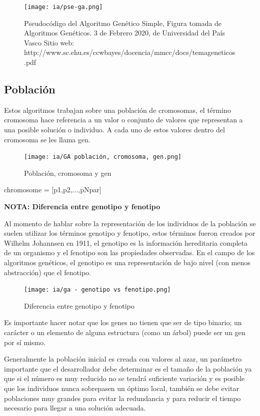 \documentclass[11pt,fleqn]{book} %
\begin{document}
\begin{figure}[ht]
\centering\texttt{[image: ia/pse-ga.png]}
\caption{Pseudocódigo del Algoritmo Genético Simple, Figura tomada de Algoritmos Genéticos. 3 de Febrero 2020, de Universidad del País Vasco Sitio web: http://www.sc.ehu.es/ccwbayes/docencia/mmcc/docs/temageneticos.pdf}
\label{fig:pse-ga} 
\end{figure}

\subsection{Población}

Estos algoritmos trabajan sobre una población de cromosomas, el término cromosoma hace referencia a un valor o conjunto de valores que representan a una posible solución o individuo. A cada uno de estos valores dentro del cromosoma se les llama gen.

\begin{figure}[ht]
\centering\texttt{[image: ia/GA población, cromosoma, gen.png]}
\caption{Población, cromosoma y gen}
\label{fig:pob-crom-gen} 
\end{figure}

chromosome = [p1,p2,...,pNpar]

\textbf{NOTA: Diferencia entre genotipo y fenotipo}

Al momento de hablar sobre la representación de los individuos de la población se suelen utilizar los términos genotipo y fenotipo, estos términos fueron creados por Wilhelm Johannsen en 1911, el genotipo es la información hereditaria completa de un organismo y el fenotipo son las propiedades observadas. En el campo de los algoritmos genéticos, el genotipo es una representación de bajo nivel (con menos abstracción) que el fenotipo.

\begin{figure}[ht]
\centering\texttt{[image: ia/ga - genotipo vs fenotipo.png]}
\caption{Diferencia entre genotipo y fenotipo}
\label{fig:dif-gen-fen} 
\end{figure}

Es importante hacer notar que los genes no tienen que ser de tipo binario; un carácter o un elemento de alguna estructura (como un árbol) puede ser un gen por sí mismo.

Generalmente la población inicial es creada con valores al azar, un parámetro importante que el desarrollador debe determinar es el tamaño de la población ya que si el número es muy reducido no se tendrá suficiente variación y es posible que los individuos nunca sobrepasen un óptimo local, también se debe evitar poblaciones muy grandes para evitar la redundancia y para reducir el tiempo necesario para llegar a una solución adecuada.
\end{document}
